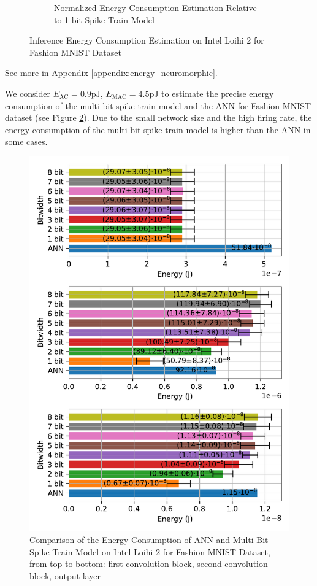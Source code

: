 \begin{figure}[!htpb]
\begin{subfigure}[H]{0.48\textwidth}
                \caption{Normalized Energy Consumption Estimation Relative to 1-bit Spike Train Model}
            \end{subfigure}
            \caption{Inference Energy Consumption Estimation on Intel Loihi 2 for Fashion MNIST Dataset}
            \label{fig:inference_energy_nh}
        \end{figure}

        See more in Appendix \ref{appendix:energy_neuromorphic}.

        We consider $E_{\text{AC}}=0.9\text{pJ}$, $E_{\text{MAC}}=4.5\text{pJ}$ \cite{6757323} to estimate the precise energy consumption of the multi-bit spike train model and the ANN for Fashion MNIST dataset (see Figure \ref{fig:energy_ann_vs_snn}). Due to the small network size and the high firing rate, the energy consumption of the multi-bit spike train model is higher than the ANN in some cases.
        \begin{figure}[!htpb]
            \centering
            \includegraphics[width=\textwidth]{../standard/FashionMNIST/plots/fashionmnist_energy_ann_vs_snn.pdf}
            \caption{Comparison of the Energy Consumption of ANN and Multi-Bit Spike Train Model on Intel Loihi 2 for Fashion MNIST Dataset, from top to bottom: first convolution block, second convolution block, output layer}
            \label{fig:energy_ann_vs_snn}
        \end{figure}

